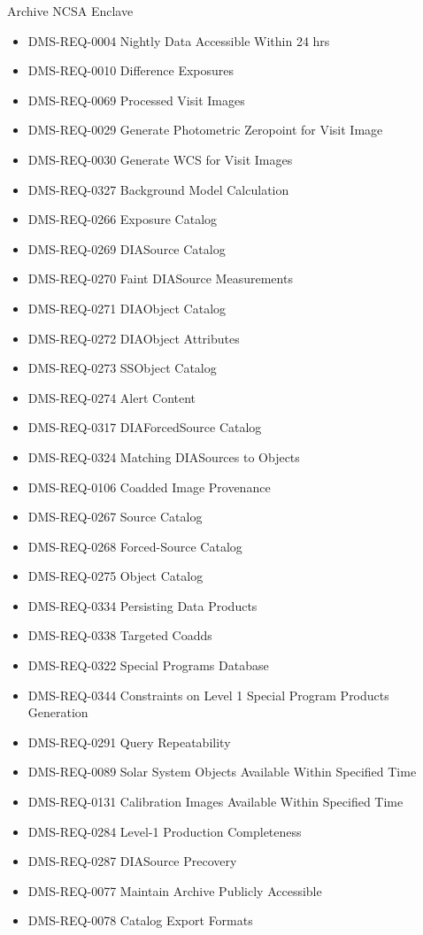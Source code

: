 Archive NCSA Enclave \begin{itemize}
\item DMS-REQ-0004 Nightly Data Accessible Within 24 hrs
\item DMS-REQ-0010 Difference Exposures
\item DMS-REQ-0069 Processed Visit Images
\item DMS-REQ-0029 Generate Photometric Zeropoint for Visit Image
\item DMS-REQ-0030 Generate WCS for Visit Images
\item DMS-REQ-0327 Background Model Calculation
\item DMS-REQ-0266 Exposure Catalog
\item DMS-REQ-0269 DIASource Catalog
\item DMS-REQ-0270 Faint DIASource Measurements
\item DMS-REQ-0271 DIAObject Catalog
\item DMS-REQ-0272 DIAObject Attributes
\item DMS-REQ-0273 SSObject Catalog
\item DMS-REQ-0274 Alert Content
\item DMS-REQ-0317 DIAForcedSource Catalog
\item DMS-REQ-0324 Matching DIASources to Objects
\item DMS-REQ-0106 Coadded Image Provenance
\item DMS-REQ-0267 Source Catalog
\item DMS-REQ-0268 Forced-Source Catalog
\item DMS-REQ-0275 Object Catalog
\item DMS-REQ-0334 Persisting Data Products
\item DMS-REQ-0338 Targeted Coadds
\item DMS-REQ-0322 Special Programs Database
\item DMS-REQ-0344 Constraints on Level 1 Special Program Products Generation
\item DMS-REQ-0291 Query Repeatability
\item DMS-REQ-0089 Solar System Objects Available Within Specified Time
\item DMS-REQ-0131 Calibration Images Available Within Specified Time
\item DMS-REQ-0284 Level-1 Production Completeness
\item DMS-REQ-0287 DIASource Precovery
\item DMS-REQ-0077 Maintain Archive Publicly Accessible
\item DMS-REQ-0078 Catalog Export Formats

\end{itemize}

